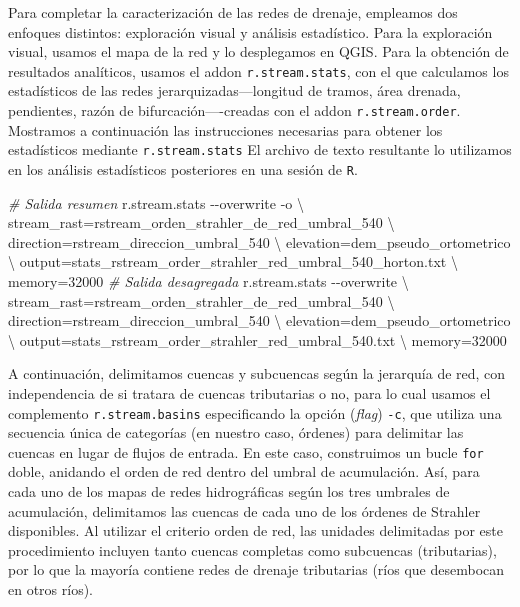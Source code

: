 \documentclass[spanish]{article}
\newenvironment{Shaded}{\begin{snugshade}}{\end{snugshade}}
\newcommand{\AttributeTok}[1]{\textcolor[rgb]{0.77,0.63,0.00}{#1}}
\newcommand{\CommentTok}[1]{\textcolor[rgb]{0.56,0.35,0.01}{\textit{#1}}}
\newcommand{\DataTypeTok}[1]{\textcolor[rgb]{0.13,0.29,0.53}{#1}}
\newcommand{\ExtensionTok}[1]{#1}
\newcommand{\NormalTok}[1]{#1}
\begin{document}
Para completar la caracterización de las redes de drenaje, empleamos dos
enfoques distintos: exploración visual y análisis estadístico. Para la
exploración visual, usamos el mapa de la red y lo desplegamos en QGIS.
Para la obtención de resultados analíticos, usamos el addon
\texttt{r.stream.stats}, con el que calculamos los estadísticos de las
redes jerarquizadas---longitud de tramos, área drenada, pendientes,
razón de bifurcación----creadas con el addon \texttt{r.stream.order}.
Mostramos a continuación las instrucciones necesarias para obtener los
estadísticos mediante \texttt{r.stream.stats} El archivo de texto
resultante lo utilizamos en los análisis estadísticos posteriores en una
sesión de \texttt{R}.

\begin{Shaded}
\begin{Highlighting}[]
\CommentTok{\# Salida resumen}
\ExtensionTok{r.stream.stats} \AttributeTok{{-}{-}overwrite} \AttributeTok{{-}o} \DataTypeTok{\textbackslash{}}
\NormalTok{  stream\_rast=rstream\_orden\_strahler\_de\_red\_umbral\_540 }\DataTypeTok{\textbackslash{}}
\NormalTok{  direction=rstream\_direccion\_umbral\_540 }\DataTypeTok{\textbackslash{}}
\NormalTok{  elevation=dem\_pseudo\_ortometrico }\DataTypeTok{\textbackslash{}}
\NormalTok{  output=stats\_rstream\_order\_strahler\_red\_umbral\_540\_horton.txt }\DataTypeTok{\textbackslash{}}
\NormalTok{  memory=32000}
\CommentTok{\# Salida desagregada}
\ExtensionTok{r.stream.stats} \AttributeTok{{-}{-}overwrite} \DataTypeTok{\textbackslash{}}
\NormalTok{  stream\_rast=rstream\_orden\_strahler\_de\_red\_umbral\_540 }\DataTypeTok{\textbackslash{}}
\NormalTok{  direction=rstream\_direccion\_umbral\_540 }\DataTypeTok{\textbackslash{}}
\NormalTok{  elevation=dem\_pseudo\_ortometrico }\DataTypeTok{\textbackslash{}}
\NormalTok{  output=stats\_rstream\_order\_strahler\_red\_umbral\_540.txt }\DataTypeTok{\textbackslash{}}
\NormalTok{  memory=32000}
\end{Highlighting}
\end{Shaded}

A continuación, delimitamos cuencas y subcuencas según la jerarquía de
red, con independencia de si tratara de cuencas tributarias o no, para
lo cual usamos el complemento \texttt{r.stream.basins} especificando la
opción (\emph{flag}) \texttt{-c}, que utiliza una secuencia única de
categorías (en nuestro caso, órdenes) para delimitar las cuencas en
lugar de flujos de entrada. En este caso, construimos un bucle
\texttt{for} doble, anidando el orden de red dentro del umbral de
acumulación. Así, para cada uno de los mapas de redes hidrográficas
según los tres umbrales de acumulación, delimitamos las cuencas de cada
uno de los órdenes de Strahler disponibles. Al utilizar el criterio
orden de red, las unidades delimitadas por este procedimiento incluyen
tanto cuencas completas como subcuencas (tributarias), por lo que la
mayoría contiene redes de drenaje tributarias (ríos que desembocan en
otros ríos).
\end{document}
